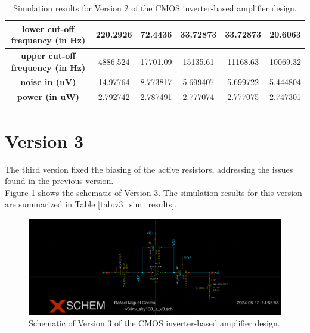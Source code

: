 \begin{table}[!ht]
\begin{adjustbox}{max width=\linewidth}
\begin{tabular}{|c|c|c|c|c|c|}
        \textbf{lower cut-off frequency (in Hz)} & 220.2926 & 72.4436 & 33.72873 & 33.72873 & 20.6063 \\ \hline
        \textbf{upper cut-off frequency (in Hz)} & 4886.524 & 17701.09 & 15135.61 & 11168.63 & 10069.32 \\ \hline
        \textbf{noise in (uV)} & 14.97764 & 8.773817 & 5.699407 & 5.699722 & 5.444804 \\ \hline
        \textbf{power (in uW)} & 2.792742 & 2.787491 & 2.777074 & 2.777075 & 2.747301 \\ \hline
    \end{tabular}
    \end{adjustbox}
    \caption{Simulation results for Version 2 of the CMOS inverter-based amplifier design.}
    \label{tab:v2_sim_results}
\end{table}

\section{Version 3}
The third version fixed the biasing of the active resistors, addressing the issues found in the previous version.
\\
Figure \ref{fig:v3_schematic} shows the schematic of Version 3. 
The simulation results for this version are summarized in Table \ref{tab:v3_sim_results}.
\begin{figure}[ht!]
    \centering
    \includegraphics[width=\textwidth]{Figures/v3_schematic.png}
    \caption{Schematic of Version 3 of the CMOS inverter-based amplifier design.}
    \label{fig:v3_schematic}
\end{figure}

